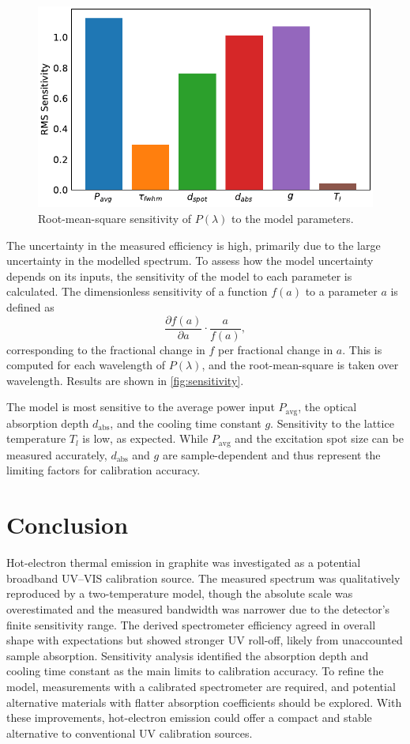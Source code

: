 \documentclass[
	parskip=half,
	a4paper,
]{scrarticle}
\begin{document}
\begin{figure}
    \centering
    \includegraphics{../analysis/figures/sensitivity bars.pdf}
    \caption{Root-mean-square sensitivity of \(P(\lambda)\) to the model parameters.}
    \label{fig:sensitivity}
\end{figure}
The uncertainty in the measured efficiency is high, primarily due to the large uncertainty in the modelled spectrum. To assess how the model uncertainty depends on its inputs, the sensitivity of the model to each parameter is calculated. The dimensionless sensitivity of a function \(f(a)\) to a parameter \(a\) is defined as
\[
\frac{\partial f(a)}{\partial a} \cdot \frac{a}{f(a)},
\]
corresponding to the fractional change in \(f\) per fractional change in \(a\). This is computed for each wavelength of \(P(\lambda)\), and the root-mean-square is taken over wavelength. Results are shown in \autoref{fig:sensitivity}.

The model is most sensitive to the average power input \(P_\text{avg}\), the optical absorption depth \(d_\text{abs}\), and the cooling time constant \(g\). Sensitivity to the lattice temperature \(T_l\) is low, as expected. While \(P_\text{avg}\) and the excitation spot size can be measured accurately, \(d_\text{abs}\) and \(g\) are sample-dependent and thus represent the limiting factors for calibration accuracy.

\section{Conclusion}
Hot-electron thermal emission in graphite was investigated as a potential broadband UV–VIS calibration source. The measured spectrum was qualitatively reproduced by a two-temperature model, though the absolute scale was overestimated and the measured bandwidth was narrower due to the detector’s finite sensitivity range. The derived spectrometer efficiency agreed in overall shape with expectations but showed stronger UV roll-off, likely from unaccounted sample absorption. Sensitivity analysis identified the absorption depth and cooling time constant as the main limits to calibration accuracy. To refine the model, measurements with a calibrated spectrometer are required, and potential alternative materials with flatter absorption coefficients should be explored. With these improvements, hot-electron emission could offer a compact and stable alternative to conventional UV calibration sources.

\clearpage
\printbibliography
\end{document}
